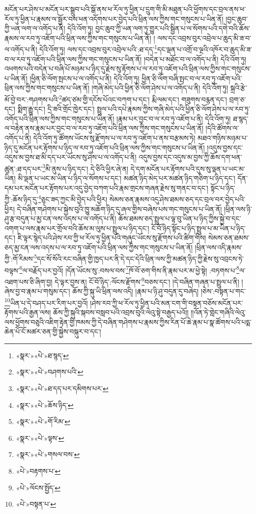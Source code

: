 མངོན་པར་ཤེས་པ་མངོན་པར་སྒྲུབ་པའི་སྒོ་ནས་ཕ་རོལ་ཏུ་ཕྱིན་པ་དྲུག་གི་མི་མཐུན་པའི་ཕྱོགས་དང་བྲལ་ནས་ཕ་རོལ་ཏུ་ཕྱིན་པ་རྣམས་ལ་སྦྱོར་བས་ཕན་འདོགས་པར་བྱེད་པའི་ཕྲིན་ལས་ཀྱིས་གང་གསུངས་པ་ཡིན་ནོ། །བྱང་ཆུབ་ཀྱི་ཡན་ལག་ལ་འགོད་པ་ནི། དེའི་འོག་ཏུ། བྱང་ཆུབ་ཀྱི་ཡན་ལག་ཏུ་གྱུར་པའི་སྦྱིན་པ་ལ་སོགས་པའི་དགེ་བའི་ཆོས་རྣམས་ལ་རབ་ཏུ་འཇོག་པའི་ཕྲིན་ལས་ཀྱིས་གང་གསུངས་པ་ཡིན་ནོ། །
ལས་དང་འབྲས་བུར་འབྲེལ་པ་ཆུད་མི་ཟ་བ་ལ་འགོད་པ་ནི། དེའི་འོག་ཏུ། ལས་དང་འབྲས་བུར་འབྲེལ་པའི་:ཐ་དད་\footnote{«སྣར་»«པེ་»ཐ་སྙད་}དང་ལྡན་པ་འགྲོ་བ་ལྔའི་འཁོར་བ་ཆུད་མི་ཟ་བ་ལ་རབ་ཏུ་འཇོག་པའི་ཕྲིན་ལས་ཀྱིས་གང་གསུངས་པ་ཡིན་ནོ། །བདེན་པ་མཐོང་བ་ལ་འགོད་པ་ནི། དེའི་འོག་ཏུ། འཕགས་པའི་བདེན་པ་བཞི་པོ་མཉམ་པ་ཉིད་དུ་རྗེས་སུ་རྟོགས་པ་ལ་རབ་ཏུ་འཇོག་པའི་ཕྲིན་ལས་ཀྱིས་གང་གསུངས་པ་ཡིན་ནོ། །ཕྱིན་ཅི་ལོག་སྤངས་པ་ལ་འགོད་པ་ནི། དེའི་འོག་ཏུ། ཕྱིན་ཅི་ལོག་བཞི་སྤང་བ་ལ་རབ་ཏུ་འཇོག་པའི་ཕྲིན་ལས་ཀྱིས་གང་གསུངས་པ་ཡིན་ནོ། །གཞི་མེད་པའི་ཕྱིན་ཅི་ལོག་ཤེས་པ་ལ་འགོད་པ་ནི། དེའི་འོག་ཏུ། སྐྲའི་རྩེ་མོ་བྱེ་བར་:གཤགས་པའི་\footnote{«སྣར་»«པེ་»བཤགས་པའི་}ཚད་ཙམ་གྱི་དངོས་པོའང་བཀག་པ་དང་། རྨི་ལམ་དང་། གཟུགས་བརྙན་དང་། བྲག་ཅ་དང་། སྨིག་རྒྱུ་དང་། དྲི་ཟའི་གྲོང་ཁྱེར་དང་། སྤྲུལ་པའི་དཔེ་རྣམས་ཀྱིས་གཞི་མེད་པའི་ཕྱིན་ཅི་ལོག་ཤེས་པ་ལ་རབ་ཏུ་འགོད་པའི་ཕྲིན་ལས་ཀྱིས་གང་གསུངས་པ་ཡིན་ནོ། །རྣམ་པར་བྱང་བ་ལ་རབ་ཏུ་འཇོག་པ་ནི། དེའི་འོག་ཏུ། ཐ་སྙད་ལ་བརྟེན་ནས་རྣམ་པར་བྱང་བ་ལ་རབ་ཏུ་འཇོག་པའི་ཕྲིན་ལས་ཀྱིས་གང་གསུངས་པ་ཡིན་ནོ། །དེའི་ཚོགས་ལ་འགོད་པ་ནི། དེའི་འོག་ཏུ་ཚོགས་ཡོངས་སུ་རྫོགས་པ་ལ་རབ་ཏུ་འཇོག་པ་ནས་བརྩམས་ཏེ། མཐའ་གཉིས་མཉམ་པ་ཉིད་དུ་མངོན་པར་རྟོགས་པ་ཉིད་ལ་རབ་ཏུ་འཇོག་པའི་ཕྲིན་ལས་ཀྱིས་གང་གསུངས་པ་ཡིན་ནོ། །འདུས་བྱས་དང་འདུས་མ་བྱས་ཐ་མི་དད་པར་ཡོངས་སུ་ཤེས་པ་ལ་འགོད་པ་ནི། འདུས་བྱས་དང་འདུས་མ་བྱས་ཀྱི་ཆོས་དག་ཕན་ཚུན་:ཐ་དད་པར་\footnote{«སྣར་»«པེ་»ཐ་དད་པར་དམིགས་པར་}མི་ནུས་པ་ཉིད་དང་། དེ་ཅིའི་ཕྱིར་ཞེ་ན། དེ་དག་མངོན་པར་རྟོགས་པའི་དུས་སུ་ལྡན་པ་ཡང་མ་ཡིན། མི་ལྡན་པ་ཡང་མ་ཡིན་པ་ཉིད་ལ་སོགས་པ་དང་། མཚན་ཉིད་མེད་པར་མཚན་ཉིད་གཅིག་པ་ཉིད་དང་། དོན་དམ་པར་མངོན་པར་རྟོགས་པར་འདུ་བྱེད་བཀག་པའི་རྣམ་གྲངས་གཞན་རྗེས་སུ་གནང་བ་དང་། སྟོང་པ་ཉིད་ཀྱི་:ཆོས་ཉིད་དུ་\footnote{«སྣར་»«པེ་»ཆོས་ཉིད་}ཅུང་ཟད་ཀྱང་མི་བྱེད་པའི་ཕྱིར། སེམས་ཅན་རྣམས་འདུ་ཤེས་ཐམས་ཅད་དང་བྲལ་བར་བྱེད་པའི་ཕྱིར། དེ་བཞིན་གཤེགས་པ་སྐྱེས་བུའི་ཁྱུ་མཆོག་ཉིད་དུ་ཞལ་གྱིས་བཞེས་པས་གང་གསུངས་པ་ཡིན་ནོ། །ཕྲིན་ལས་ཉི་ཤུ་རྩ་བདུན་པ་མྱ་ངན་ལས་འདས་པ་ལ་འགོད་པ་ནི། ཆོས་ཐམས་ཅད་སྤྲུལ་པ་ལྟ་བུ་ཡིན་པ་ཉིད་ཀྱིས་སྐྱེ་བ་དང་འགག་པ་ལས་རྣམ་པར་གྲོལ་བའི་ཆོས་མ་ལུས་པ་སྤྲུལ་པ་ཉིད་དང་། ངོ་བོ་ཉིད་སྟོང་པ་ཉིད་སྤྲུལ་པ་མ་ཡིན་པ་ཉིད་དང་། ཇི་ལྟར་སྙེད་པའི་ཤེས་རབ་ཀྱི་ཕ་རོལ་ཏུ་ཕྱིན་པའི་གཞུང་ཡོངས་སུ་རྫོགས་པའི་ཚིག་གིས། སེམས་ཅན་ཐམས་ཅད་མྱ་ངན་ལས་འདས་པ་ལ་རབ་ཏུ་འཇོག་པའི་ཕྲིན་ལས་ཀྱིས་གང་གསུངས་པ་ཡིན་ནོ། །ཕྲིན་ལས་འདི་རྣམས་ཀྱི་:གོ་རིམས་\footnote{«སྣར་»«པེ་»གོ་རིམ་}དང་སོ་སོའི་རང་བཞིན་གྱི་ཁྱད་པར་ནི་དེ་དང་དེའི་ཕྲིན་ལས་ཀྱི་མཚན་ཉིད་ཀྱི་རྗེས་སུ་འབྲངས་ཏེ་བལྟས་\footnote{«སྣར་»«པེ་»ལྟས་}ལ་བརྗོད་པར་བྱའོ། །དོན་ཡོངས་སུ་:བསལ་བས་\footnote{«སྣར་»«པེ་»གསལ་བས་}ཁོ་བོ་ཅག་གིས་ནི་རྣམ་པར་མ་ཕྱེ་སྟེ། :བཏགས་པ་\footnote{«པེ་»བརྟགས་པ་}ལ་འཐག་པས་ཅི་ཞིག་བྱ། དེ་ལྟར་བྱས་ན། ངོ་བོ་ཉིད་:ལོངས་རྫོགས་\footnote{«པེ་»ལོངས་སྤྱོད་}བཅས་དང་། །དེ་བཞིན་གཞན་པ་སྤྲུལ་པ་ནི། །ཞེས་བྱ་བ་རྣམ་པ་གསུམ་དང་། ཆོས་ཀྱི་སྐུ་ཡི་ཕྲིན་ལས་འདི། །རྣམ་པ་ཉི་ཤུ་བདུན་དུ་བཞེད། །ཅེས་:བསྟན་པ་གང་\footnote{«པེ་»བསྟན་པ་}ཡིན་པ་དེ་བཤད་པར་རིག་པར་བྱའོ། །ཤེས་རབ་ཀྱི་ཕ་རོལ་ཏུ་ཕྱིན་པའི་མན་ངག་གི་བསྟན་བཅོས་མངོན་པར་རྟོགས་པའི་རྒྱན་ལས། ཆོས་ཀྱི་སྐུའི་སྐབས་བསླབ་པའི་འབྲས་བུའི་ལེའུ་སྟེ་བརྒྱད་པའོ།། །།འོན་ཏེ་གླེང་གཞིའི་ལེའུ་ལས་ཕྱོགས་བཅུའི་འཇིག་རྟེན་གྱི་ཁམས་ཀྱི་དེ་བཞིན་གཤེགས་པ་རྣམས་ཀྱིས་རིན་པོ་ཆེ་རྣམ་པ་སྣ་ཚོགས་པའི་པདྨ་ཆེན་པོ་ངོ་མཚར་ཅན་གྱི་སྐྱེས་བསྐུར་བ་དང་། 